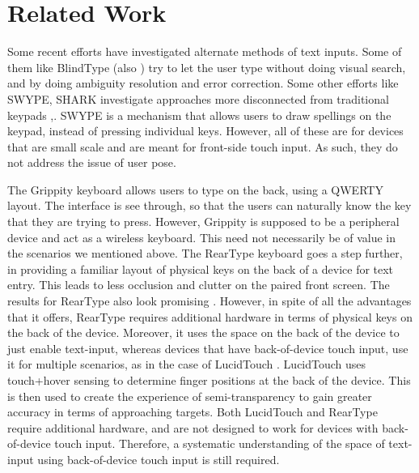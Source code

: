 \section{Related Work}

Some recent efforts have investigated alternate methods of text inputs. Some of them like BlindType \cite{BlindType} (also \cite{Brewster}) try to let the user type without doing visual search, and by doing ambiguity resolution and error correction. Some other efforts like SWYPE, SHARK investigate approaches more disconnected from traditional keypads \cite{Zhai},\cite{Swype}. SWYPE is a mechanism that allows users to draw spellings on the keypad, instead of pressing individual keys. However, all of these are for devices that are small scale and are meant for front-side touch input.  As such, they do not address the issue of user pose.

The Grippity keyboard \cite{Grippity} allows users to type on the back, using a QWERTY layout. The interface is see through, so that the users can naturally know the key that they are trying to press. However, Grippity is supposed to be a peripheral device and act as a wireless keyboard. This need not necessarily be of value in the scenarios we mentioned above. The RearType keyboard goes a step further, in providing a familiar layout of physical keys on the back of a device for text entry. This leads to less occlusion and clutter on the paired front screen. The results for RearType also look promising \cite{RearType}. However, in spite of all the advantages that it offers, RearType requires additional hardware in terms of physical keys on the back of the device. Moreover, it uses the space on the back of the device to just enable text-input, whereas devices that have back-of-device touch input, use it for multiple scenarios, as in the case of LucidTouch \cite{LucidTouch}. LucidTouch uses touch+hover sensing to determine finger positions at the back of the device. This is then used to create the experience of semi-transparency to gain greater accuracy in terms of approaching targets. Both LucidTouch and RearType require additional hardware, and are not designed to work for devices with back-of-device touch input. Therefore, a systematic understanding of the space of text-input using back-of-device touch input is still required.

